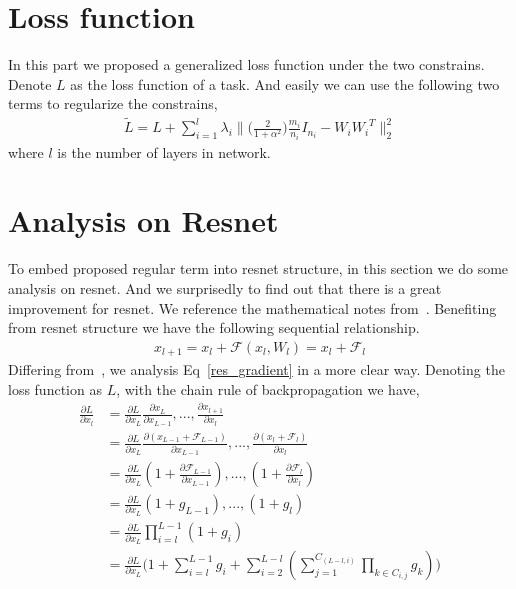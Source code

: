 \documentclass[]{article}
\begin{document}
\section{Loss function}
In this part we proposed a generalized loss function under the two constrains. Denote $L$ as the loss function of a task. And easily we can use the following two terms to regularize the constrains,
\begin{align}\label{Loss fuction}
\tilde{L}=L+\sum_{i=1}^{l}\lambda_{i}\|\big(\frac{2}{1+\alpha^2}\big)\frac{m_{i}}{n_i}I_{n_i}-{W_i}{W_i}^{T}\|_2^2
\end{align}
where $l$ is the number of layers in network.
\section{Analysis on Resnet}
To embed proposed regular term into resnet structure, in this section we do some analysis on resnet. And we surprisedly to find out that there is a great improvement for resnet. We reference the mathematical notes from~\cite{identity_mapping}. Benefiting from resnet structure we have the following sequential relationship.
\begin{align}\label{res_gradient}
x_{l+1}=x_{l}+\mathcal{F}(x_{l},W_{l})=x_{l}+\mathcal{F}_{l}
\end{align}
Differing from~\cite{identity_mapping}, we analysis Eq~\ref{res_gradient} in a more clear way. Denoting the loss function as $L$, with the chain rule of backpropagation we have,
\begin{align}\label{backpro}
\frac{\partial L}{\partial x_{l}}&=\frac{\partial L}{\partial x_{L}}\frac{\partial x_{L}}{\partial x_{L-1}}, ..., \frac{\partial x_{l+1}}{\partial x_{l}} \\
&=\frac{\partial L}{\partial x_{L}}\frac{\partial(x_{L-1}+\mathcal{F}_{L-1})}{\partial x_{L-1}}, ..., \frac{\partial(x_{l}+\mathcal{F}_{l})}{\partial x_{l}}  \\
&=\frac{\partial L}{\partial x_{L}}(1+\frac{\partial \mathcal{F}_{L-1}}{\partial x_{L-1}}), ..., (1+\frac{\partial \mathcal{F}_{l}}{\partial x_{l}})   \\
&=\frac{\partial L}{\partial x_{L}}(1+g_{L-1}), ..., (1+g_{l})   \\
&=\frac{\partial L}{\partial x_{L}}\prod_{i=l}^{L-1}(1+g_{i})   \\
&=\frac{\partial L}{\partial x_{L}}\big(1+\sum_{i=l}^{L-1}g_{i}+\sum_{i=2}^{L-l}(\sum_{j=1}^{C_{(L-l,i)}}\prod_{k \in C_{i,j}}g_{k})\big)
\end{align}
\end{document}
